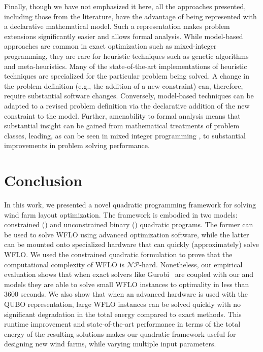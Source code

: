 \documentclass[preprint,12pt]{elsarticle}
\newcommand{\qcls}{{\sf {\small QC-LS\xspace}}}
\newcommand{\quls}{{\sf {\small QU-LS\xspace}}}
\begin{document}
Finally, though we have not emphasized it here, all the approaches presented, including those from the literature, have the advantage of being represented with a declarative mathematical model. Such a representation makes problem extensions significantly easier and allows formal analysis. While model-based  approaches are common in exact optimization such as mixed-integer programming, they are rare for heuristic techniques such as genetic algorithms and meta-heuristics. Many of the state-of-the-art implementations of heuristic techniques are specialized for the particular problem being solved. A change in the problem definition (e.g., the addition of a new constraint) can, therefore, require substantial software changes. Conversely, model-based techniques can be adapted to a revised problem definition via the declarative addition of the new constraint to the model. Further, amenability to formal analysis means that substantial insight can be gained from mathematical treatments of problem classes, leading, as can be seen in mixed integer programming \cite{Bixby07a}, to substantial improvements in problem solving performance.


  
\section{Conclusion}
\label{sec:conclusion}

In this work, we presented a novel quadratic programming framework
for solving 
wind farm layout optimization. 
The framework is embodied in two models: constrained (\qcls) and unconstrained binary
 (\quls) quadratic programs. The former can be used to solve WFLO using advanced optimization software,
while the latter can be mounted onto specialized hardware that can quickly (approximately) solve WFLO. We used the constrained quadratic formulation to prove 
that the computational complexity of WFLO is $\mathcal{NP}$-hard. Nonetheless,
our empirical evaluation shows that when exact solvers like Gurobi~\cite{gurobi} are
coupled with our \qcls{} and \quls{} models they are able to solve small WFLO instances to optimality in less than 3600 seconds.
We also show that when an advanced hardware is used with the QUBO representation, large WFLO instances can be solved quickly with no significant degradation in the total energy compared to exact methods.
This runtime improvement and state-of-the-art performance in terms of the total energy of the resulting solutions makes our quadratic framework useful for designing new wind farms, while varying multiple input parameters. 
\end{document}

